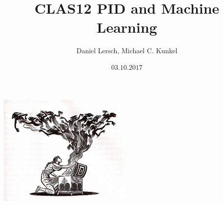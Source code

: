 \documentclass[xcolor=table, xcolor=dvipsnames]{beamer}
\begin{document}

\renewcommand{\inserttotalframenumber}{11} 



\title[CLAS12]{CLAS12 PID and Machine Learning}
    \author[Daniel Lersch]{Daniel Lersch, Michael C. Kunkel} 
      \date{$03.10.2017$} 
    
    \begin{frame}
      \titlepage
      
       \begin{center}
     \includegraphics[width=0.5\textwidth]{tmva_fun.jpg}
   \end{center}
    \end{frame}
    
\end{document}
